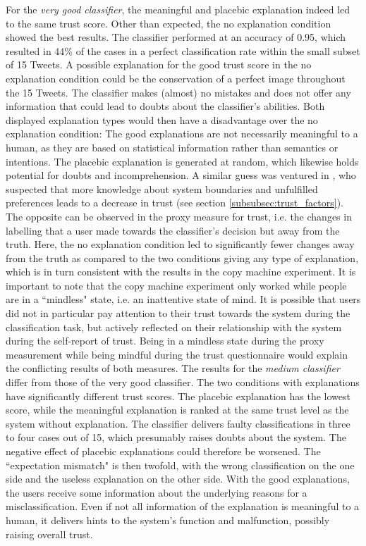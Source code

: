 For the \textit{very good classifier}, the meaningful and placebic explanation indeed led to the same trust score. Other than expected, the no explanation condition showed the best results. The classifier performed at an accuracy of 0.95, which resulted in 44\% of the cases in a perfect classification rate within the small subset of 15 Tweets. A possible explanation for the good trust score in the no explanation condition could be the conservation of a perfect image throughout the 15 Tweets. The classifier makes (almost) no mistakes and does not offer any information that could lead to doubts about the classifier's abilities. Both displayed explanation types would then have a disadvantage over the no explanation condition: The good explanations are not necessarily meaningful to a human, as they are based on statistical information rather than semantics or intentions. The placebic explanation is generated at random, which likewise holds potential for doubts and incomprehension. A similar guess was ventured in \cite{cramer2008effects}, who suspected that more knowledge about system boundaries and unfulfilled preferences leads to a decrease in trust (see section \ref{subsubsec:trust_factors}). The opposite can be observed in the proxy measure for trust, i.e. the changes in labelling that a user made towards the classifier's decision but away from the truth. Here, the no explanation condition led to significantly fewer changes away from the truth as compared to the two conditions giving any type of explanation, which is in turn consistent with the results in the copy machine experiment. It is important to note that the copy machine experiment only worked while people are in a ``mindless" state, i.e. an inattentive state of mind. It is possible that users did not in particular pay attention to their trust towards the system during the classification task, but actively reflected on their relationship with the system during the self-report of trust. Being in a mindless state during the proxy measurement while being mindful during the trust questionnaire would explain the conflicting results of both measures.\newline
The results for the \textit{medium classifier} differ from those of the very good classifier. The two conditions with explanations have significantly different trust scores. The placebic explanation has the lowest score, while the meaningful explanation is ranked at the same trust level as the system without explanation. The classifier delivers faulty classifications in three to four cases out of 15, which presumably raises doubts about the system. The negative effect of placebic explanations could therefore be worsened. The ``expectation mismatch" is then twofold, with the wrong classification on the one side and the useless explanation on the other side. With the good explanations, the users receive some information about the underlying reasons for a misclassification. Even if not all information of the explanation is meaningful to a human, it delivers hints to the system's function and malfunction, possibly raising overall trust.\newline

